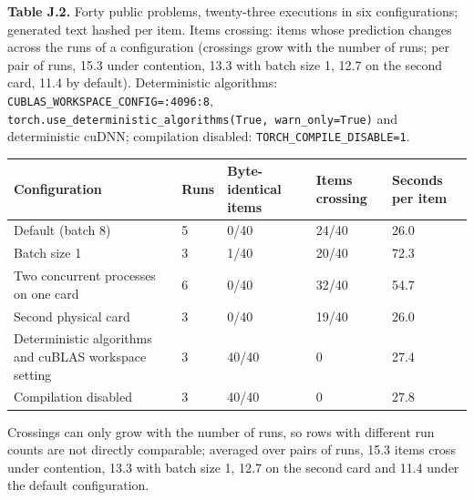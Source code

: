 \begin{center}\begin{minipage}{\linewidth}
\noindent\textbf{Table J.2.} Forty public problems, twenty-three executions in six configurations; generated text hashed per item. Items crossing: items whose prediction changes across the runs of a configuration (crossings grow with the number of runs; per pair of runs, 15.3 under contention, 13.3 with batch size 1, 12.7 on the second card, 11.4 by default). Deterministic algorithms: \texttt{CUBLAS\_WORKSPACE\_CONFIG=:4096:8}, \texttt{torch.use\_deterministic\_algorithms(True, warn\_only=True)} and deterministic cuDNN; compilation disabled: \texttt{TORCH\_COMPILE\_DISABLE=1}.\par\smallskip
{\footnotesize\setlength{\tabcolsep}{4pt}
\begin{tabular}{L{4.6cm}L{0.9cm}L{2.2cm}L{2.0cm}L{1.6cm}}
\toprule
\textbf{Configuration} & \textbf{Runs} & \textbf{Byte-identical items} & \textbf{Items crossing} & \textbf{Seconds per item} \\
\midrule
Default (batch 8) & 5 & 0/40 & 24/40 & 26.0 \\
Batch size 1 & 3 & 1/40 & 20/40 & 72.3 \\
Two concurrent processes on one card & 6 & 0/40 & 32/40 & 54.7 \\
Second physical card & 3 & 0/40 & 19/40 & 26.0 \\
Deterministic algorithms and cuBLAS workspace setting & 3 & 40/40 & 0 & 27.4 \\
Compilation disabled & 3 & 40/40 & 0 & 27.8 \\
\bottomrule
\end{tabular}
}
\end{minipage}\end{center}

Crossings can only grow with the number of runs, so rows with different run counts are not directly comparable; averaged over pairs of runs, 15.3 items cross under contention, 13.3 with batch size 1, 12.7 on the second card and 11.4 under the default configuration.

